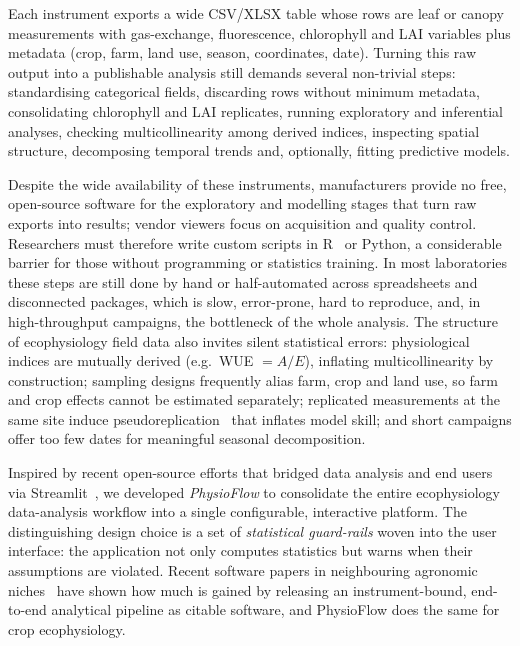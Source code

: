 \documentclass[11pt, letterpaper]{article}
\begin{document}
Each instrument exports a wide CSV/XLSX table whose rows are leaf or canopy measurements with gas-exchange, fluorescence, chlorophyll and LAI variables plus metadata (crop, farm, land use, season, coordinates, date). Turning this raw output into a publishable analysis still demands several non-trivial steps: standardising categorical fields, discarding rows without minimum metadata, consolidating chlorophyll and LAI replicates, running exploratory and inferential analyses, checking multicollinearity among derived indices, inspecting spatial structure, decomposing temporal trends and, optionally, fitting predictive models.

Despite the wide availability of these instruments, manufacturers provide no free, open-source software for the exploratory and modelling stages that turn raw exports into results; vendor viewers focus on acquisition and quality control. Researchers must therefore write custom scripts in R~\cite{Rcore} or Python, a considerable barrier for those without programming or statistics training. In most laboratories these steps are still done by hand or half-automated across spreadsheets and disconnected packages, which is slow, error-prone, hard to reproduce, and, in high-throughput campaigns, the bottleneck of the whole analysis. The structure of ecophysiology field data also invites silent statistical errors: physiological indices are mutually derived (e.g.\ WUE $= A/E$), inflating multicollinearity by construction; sampling designs frequently alias farm, crop and land use, so farm and crop effects cannot be estimated separately; replicated measurements at the same site induce pseudoreplication~\cite{Hurlbert1984} that inflates model skill; and short campaigns offer too few dates for meaningful seasonal decomposition.

Inspired by recent open-source efforts that bridged data analysis and end users via Streamlit~\cite{Streamlit,daSilva2025Parkinson,DaSilva2026Goias}, we developed \emph{PhysioFlow} to consolidate the entire ecophysiology data-analysis workflow into a single configurable, interactive platform. The distinguishing design choice is a set of \emph{statistical guard-rails} woven into the user interface: the application not only computes statistics but warns when their assumptions are violated. Recent software papers in neighbouring agronomic niches~\cite{Magala2026apsimNGpy,Crecco2026prismatools} have shown how much is gained by releasing an instrument-bound, end-to-end analytical pipeline as citable software, and PhysioFlow does the same for crop ecophysiology.
\end{document}
